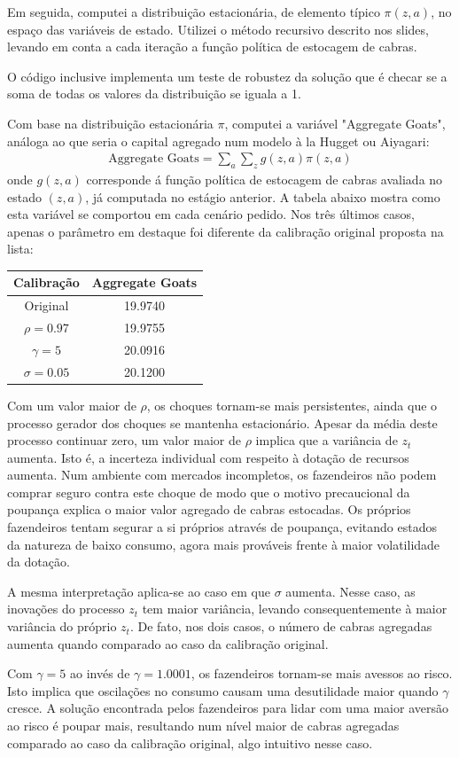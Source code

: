 \documentclass[11pt]{article}
\theoremstyle{definition}
\theoremstyle{solution}
\begin{document}
Em seguida, computei a distribuição estacionária, de elemento típico $\pi(z, a)$, no espaço das variáveis de estado. Utilizei o método recursivo descrito nos slides, levando em conta a cada iteração a função política de estocagem de cabras.

O código inclusive implementa um teste de robustez da solução que é checar se a soma de todas os valores da distribuição se iguala a 1.

Com base na distribuição estacionária $\pi$, computei a variável "Aggregate Goats", análoga ao que seria o capital agregado num modelo à la Hugget ou Aiyagari:
\begin{gather*}
	\text{Aggregate Goats} = \sum\limits_{a}\sum\limits_{z}g(z,a)\pi(z,a)
\end{gather*}
onde $g(z,a)$ corresponde á função política de estocagem de cabras avaliada no estado $(z,a)$, já computada no estágio anterior. A tabela abaixo mostra como esta variável se comportou em cada cenário pedido. Nos três últimos casos, apenas o parâmetro em destaque foi diferente da calibração original proposta na lista:
\begin{center}
	\begin{tabular}{c|c}
	Calibração & Aggregate Goats\\
	\hline
	\hline
	Original & 19.9740\\
	$\rho = 0.97$ & 19.9755\\
	$\gamma = 5$ & 20.0916\\
	$\sigma = 0.05$ & 20.1200
\end{tabular}
\end{center}
Com um valor maior de $\rho$, os choques tornam-se mais persistentes, ainda que o processo gerador dos choques se mantenha estacionário. Apesar da média deste processo continuar zero, um valor maior de $\rho$ implica que a variância de $z_{t}$ aumenta. Isto é, a incerteza individual com respeito à dotação de recursos aumenta. Num ambiente com mercados incompletos, os fazendeiros não podem comprar seguro contra este choque de modo que o motivo precaucional da poupança explica o maior valor agregado de cabras estocadas. Os próprios fazendeiros tentam segurar a si próprios através de poupança, evitando estados da natureza de baixo consumo, agora mais prováveis frente à maior volatilidade da dotação.

A mesma interpretação aplica-se ao caso em que $\sigma$ aumenta. Nesse caso, as inovações do processo $z_{t}$ tem maior variância, levando consequentemente à maior variância do próprio $z_{t}$. De fato, nos dois casos, o número de cabras agregadas aumenta quando comparado ao caso da calibração original.

Com $\gamma = 5$ ao invés de $\gamma = 1.0001$, os fazendeiros tornam-se mais avessos ao risco. Isto implica que oscilações no consumo causam uma desutilidade maior quando $\gamma$ cresce. A solução encontrada pelos fazendeiros para lidar com uma maior aversão ao risco é poupar mais, resultando num nível maior de cabras agregadas comparado ao caso da calibração original, algo intuitivo nesse caso.
\end{document}
